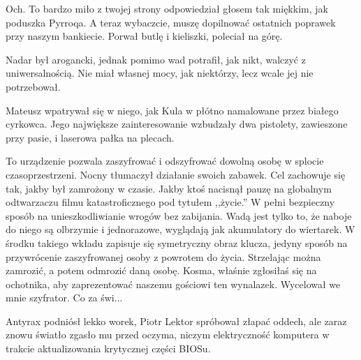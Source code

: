 \begin{dialogue}
\ds{} Och. To bardzo miło z twojej strony \dm{} odpowiedział głosem tak miękkim, jak poduszka Pyrroqa. \dm{} A teraz wybaczcie, muszę dopilnować ostatnich poprawek przy naszym bankiecie. \dm{}
Porwał butlę i kieliszki, poleciał na górę.
\end{dialogue}

Nadar był arogancki, jednak pomimo wad potrafił, jak nikt, walczyć z uniwersalnością.
Nie miał własnej mocy, jak niektórzy, lecz wcale jej nie potrzebował.

Mateusz wpatrywał się w niego, jak Kula w płótno namalowane przez białego cyrkowca.
Jego największe zainteresowanie wzbudzały dwa pistolety, zawieszone przy pasie, i laserowa pałka na plecach.

\begin{dialogue}
\ds{} To urządzenie pozwala zaszyfrować i odszyfrować dowolną osobę w splocie czasoprzestrzeni. \dm{} Nocny tłumaczył działanie swoich zabawek. \dm{}
Cel zachowuje się tak, jakby był zamrożony w czasie. Jakby ktoś nacisnął pauzę na globalnym odtwarzaczu filmu katastroficznego pod tytułem ,,życie.''
W pełni bezpieczny sposób na unieszkodliwianie wrogów bez zabijania.
Wadą jest tylko to, że naboje do niego są olbrzymie i jednorazowe, wyglądają jak akumulatory do wiertarek.
W środku takiego wkładu zapisuje się symetryczny obraz klucza, jedyny sposób na przywrócenie zaszyfrowanej osoby z powrotem do życia.
Strzelając można zamrozić, a potem odmrozić daną osobę.
Kosma, właśnie zgłosiłaś się na ochotnika, aby zaprezentować naszemu gościowi ten wynalazek. \dm{} Wycelował we mnie szyfrator. Co za świ...
\end{dialogue}

\divider{}

Antyrax podniósł lekko worek, Piotr Lektor spróbował złapać oddech, ale zaraz znowu światło zgasło mu przed oczyma, niczym elektryczność komputera w trakcie aktualizowania krytycznej części BIOSu.

\divider{}

